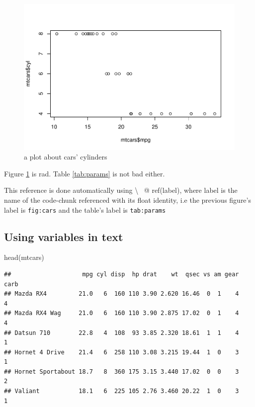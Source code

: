\documentclass[
  11pt,
]{article}
\newenvironment{Shaded}{\begin{snugshade}}{\end{snugshade}}
\newcommand{\FunctionTok}[1]{\textcolor[rgb]{0.00,0.00,0.00}{#1}}
\newcommand{\NormalTok}[1]{#1}
\begin{document}
\begin{figure}
\centering
\includegraphics{syntax_files/figure-latex/cars-1.pdf}
\caption{\label{fig:cars}a plot about cars' cylinders}
\end{figure}

Figure \ref{fig:cars} is rad. Table \ref{tab:params} is not bad either.

This reference is done automatically using \textbackslash{} ~@ ref(label), where label is the name of the code-chunk referenced with its float identity, i.e the previous figure's label is \texttt{fig:cars} and the table's label is \texttt{tab:params}

\hypertarget{using-variables-in-text}{%
\subsection{Using variables in text}\label{using-variables-in-text}}

\begin{Shaded}
\begin{Highlighting}[]
\FunctionTok{head}\NormalTok{(mtcars)}
\end{Highlighting}
\end{Shaded}

\begin{verbatim}
##                    mpg cyl disp  hp drat    wt  qsec vs am gear carb
## Mazda RX4         21.0   6  160 110 3.90 2.620 16.46  0  1    4    4
## Mazda RX4 Wag     21.0   6  160 110 3.90 2.875 17.02  0  1    4    4
## Datsun 710        22.8   4  108  93 3.85 2.320 18.61  1  1    4    1
## Hornet 4 Drive    21.4   6  258 110 3.08 3.215 19.44  1  0    3    1
## Hornet Sportabout 18.7   8  360 175 3.15 3.440 17.02  0  0    3    2
## Valiant           18.1   6  225 105 2.76 3.460 20.22  1  0    3    1
\end{verbatim}
\end{document}
